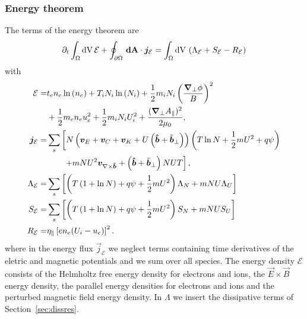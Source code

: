 \subsubsection{Energy theorem}
The terms of the energy theorem are
\begin{align} \label{eq:energy_theorem}
\partial_t \int_\Omega \mathrm{dV}\, \mathcal E +
\oint_{\partial\Omega} {\boldsymbol{\,\mathrm{dA}}} \cdot {\boldsymbol{j}}_{\mathcal E}
= \int_\Omega \mathrm{dV}\, \left( \Lambda_{\mathcal E}
+  S_{\mathcal E}
-  R_{\mathcal E} \right)
\end{align}
with
\begin{align} \label{eq:energy_conservation_dimensional}
  \mathcal E = &
  t_e n_e \ln{(n_e)} +T_i N_i\ln{(N_i)}
    +\frac{1}{2} m_i N_i \left(\frac{{\boldsymbol{\nabla}}_\perp\phi}{B}\right)^2 \nonumber\\
    &+\frac{1}{2} m_e  n_e u_e^2 +\frac{1}{2} m_i  N_i U_i^2
    + \frac{({\boldsymbol{\nabla}}_\perp A_\parallel)^2}{2\mu_0}, \\
  {\boldsymbol{j}}_{\mathcal E} =& \sum_s \left[ N\left(
  {\boldsymbol{v}}_E + {\boldsymbol{v}}_C + {\boldsymbol{v}}_{K} +U\left(\bm{\hat{b}}+\tilde{{\boldsymbol{b}}}_\perp\right)  \right)
  \left(T \ln N + \frac{1}{2}m U^2 + q\psi  \right) \right. \nonumber\\
  &\qquad \left . + mNU^2{\boldsymbol{v}}_{\nabla\times\bm{\hat{b}}} + \left(\bm{\hat{b}} + \tilde{{\boldsymbol{b}}}_\perp\right) NUT\right], \\
  \Lambda_{\mathcal E} =&  \sum_s \left[\left(T\left( 1+\ln{N}\right) +q \psi + \frac{1}{2} m U^2 \right)\Lambda_{N}  + mNU \Lambda_U\right]
\nonumber \\
  S_{\mathcal E} =&  \sum_s  \left[\left(T\left( 1+\ln{N}\right) +q \psi + \frac{1}{2} m U^2 \right)S_{N}  + mNU S_U\right]
\nonumber \\
  R_{\mathcal E} =&  \eta_\parallel  \left[e n_e(U_i-u_e)\right]^2.
\end{align}
where in the energy flux $\vec j_{\mathcal E}$
we neglect terms  containing time derivatives
of the eletric and magnetic potentials and we sum over all species.
The energy density $\mathcal E$ consists of the Helmholtz free energy density for electrons and ions,
the \(\vec{E} \times \vec{B}\) energy density, the parallel energy densities for electrons and ions and the perturbed magnetic field energy density.
In \(\Lambda\) we insert the dissipative terms of Section~\ref{sec:dissres}. \\
